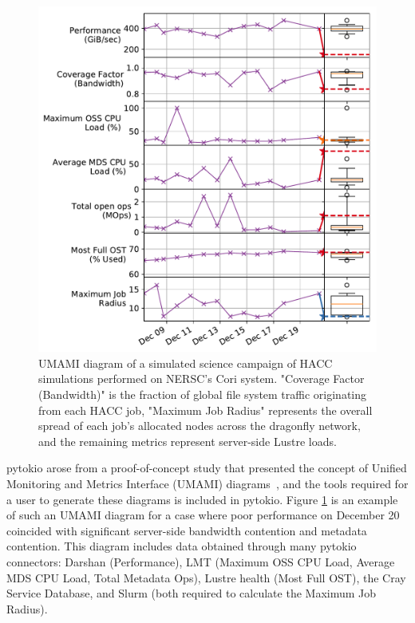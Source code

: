 \begin{figure}[t]
    \centering
    \includegraphics[width=1.0\columnwidth]{umami}
    \vspace{-.3in}
    \caption{UMAMI diagram of a simulated science campaign of HACC~\cite{Habib2012} simulations performed on NERSC's Cori system.  
    "Coverage Factor (Bandwidth)" is the fraction of global file system traffic originating from each HACC job, "Maximum Job Radius" represents the overall spread of each job's allocated nodes across the dragonfly network, and the remaining metrics represent server-side Lustre loads.}
    \label{fig:umami}
    \vspace{-.2in}
\end{figure}

pytokio arose from a proof-of-concept study that presented the concept of Unified Monitoring and Metrics Interface (UMAMI) diagrams~\cite{Lockwood2017}, and the tools required for a user to generate these diagrams is included in pytokio.
Figure \ref{fig:umami} is an example of such an UMAMI diagram for a case where poor performance on December 20 coincided with significant server-side bandwidth contention and metadata contention.
This diagram includes data obtained through many pytokio connectors: Darshan (Performance), LMT (Maximum OSS CPU Load, Average MDS CPU Load, Total Metadata Ops), Lustre health (Most Full OST), the Cray Service Database, and Slurm (both required to calculate the Maximum Job Radius).

